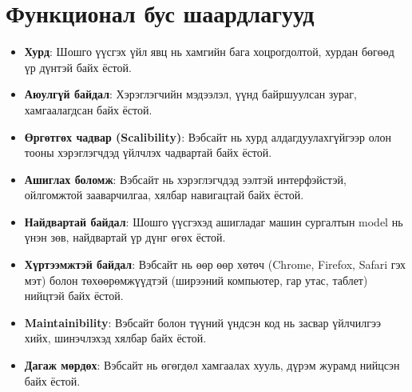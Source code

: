 \section{Функционал бус шаардлагууд}
\begin{itemize}
	\item \textbf{Хурд}: Шошго үүсгэх үйл явц нь хамгийн бага хоцрогдолтой, хурдан бөгөөд үр дүнтэй байх ёстой.

	\item \textbf{Аюулгүй байдал}: Хэрэглэгчийн мэдээлэл, үүнд байршуулсан зураг, хамгаалагдсан байх ёстой.

	\item \textbf{Өргөтгөх чадвар (Scalibility)}: Вэбсайт нь хурд алдагдуулахгүйгээр олон тооны хэрэглэгчдэд үйлчлэх чадвартай байх ёстой.

	\item \textbf{Ашиглах боломж}: Вэбсайт нь хэрэглэгчдэд ээлтэй интерфэйстэй, ойлгомжтой зааварчилгаа, хялбар навигацтай байх ёстой.

	\item \textbf{Найдвартай байдал}: Шошго үүсгэхэд ашигладаг машин сургалтын model нь үнэн зөв, найдвартай үр дүнг өгөх ёстой.

	\item \textbf{Хүртээмжтэй байдал}: Вэбсайт нь өөр өөр хөтөч (Chrome, Firefox, Safari гэх мэт) болон төхөөрөмжүүдтэй (ширээний компьютер, гар утас, таблет) нийцтэй байх ёстой.

	\item \textbf{Maintainibility}: Вэбсайт болон түүний үндсэн код нь засвар үйлчилгээ хийх, шинэчлэхэд хялбар байх ёстой.

	\item \textbf{Дагаж мөрдөх}: Вэбсайт нь өгөгдөл хамгаалах хууль, дүрэм журамд нийцсэн байх ёстой.
\end{itemize}
